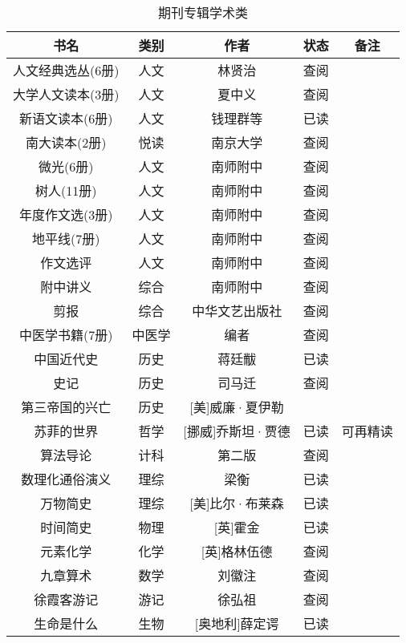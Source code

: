 \documentclass[UTF8,12pt]{ctexart}
\begin{document}
\begin{table}[h]
\centering
\begin{tabular}{ccccc}
\toprule
书名&类别&作者&状态&备注\\
\midrule
人文经典选丛(6册)&人文&林贤治&查阅\\
大学人文读本(3册)&人文&夏中义&查阅\\
新语文读本(6册)&人文&钱理群等&已读\\
南大读本(2册)&悦读&南京大学&查阅\\
微光(6册)&人文&南师附中&查阅\\
树人(11册)&人文&南师附中&查阅\\
年度作文选(3册)&人文&南师附中&查阅\\
地平线(7册)&人文&南师附中&查阅\\
作文选评&人文&南师附中&查阅\\
附中讲义&综合&南师附中&查阅\\
剪报&综合&中华文艺出版社&查阅\\
中医学书籍(7册)&中医学&编者&查阅\\
中国近代史&历史&蒋廷黻&已读\\
史记&历史&司马迁&查阅\\
第三帝国的兴亡&历史&[美]威廉·夏伊勒\\
苏菲的世界&哲学&[挪威]乔斯坦·贾德&已读&可再精读\\
算法导论&计科&第二版&查阅\\
数理化通俗演义&理综&梁衡&已读\\
万物简史&理综&[美]比尔·布莱森&已读\\
时间简史&物理&[英]霍金&已读\\
元素化学&化学&[英]格林伍德&查阅\\
九章算术&数学&刘徽注&查阅\\
徐霞客游记&游记&徐弘祖&查阅\\
生命是什么&生物&[奥地利]薛定谔&已读\\
\bottomrule
\end{tabular}
\caption{期刊专辑学术类}
\end{table}
\end{document}
